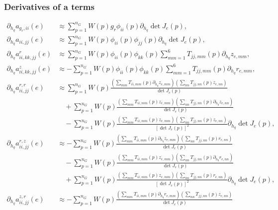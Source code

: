 \documentclass{article}
\begin{document}
\subsubsection{Derivatives of a terms}
\begin{align}
\partial_{h_q} a_{g_r,ii}(e) &\approx \sum_{p=1}^{n_G} W(p) g_r \phi_{ii}(p) \partial_{h_q} \det J_e(p), \tag{20.55}\\
\partial_{h_q} a_{ii,jj}(e) &\approx \sum_{p=1}^{n_G} W(p) \phi_{ii}(p) \phi_{jj}(p) \partial_{h_q} \det J_e(p), \tag{20.58}\\
\partial_{h_q} a_{ii,kk,jj}^{r}(e) &\approx \sum_{p=1}^{n_G} W(p) \phi_{ii}(p) \phi_{kk}(p) \sum_{mm=1}^6 T_{jj,mm}(p) \partial_{h_q} z_{e,mm}, \tag{20.61}\\
\partial_{h_q} a_{ii,kk,jj}^{z}(e) &\approx -\sum_{p=1}^{n_G} W(p) \phi_{ii}(p) \phi_{kk}(p) \sum_{mm=1}^6 T_{jj,mm}(p) \partial_{h_q} r_{e,mm}, \tag{20.64}\\
\partial_{h_q} a_{ii,jj}^{r,r}(e) &\approx \sum_{p=1}^{n_G} W(p) \frac{ \left( \sum_{mm} T_{ii,mm}(p) \partial_{h_q} z_{e,mm} \right) \left( \sum_{nn} T_{jj,nn}(p) z_{e,nn} \right) }{ \det J_e(p) } \nonumber\\
&\quad + \sum_{p=1}^{n_G} W(p) \frac{ \left( \sum_{mm} T_{ii,mm}(p) z_{e,mm} \right) \left( \sum_{nn} T_{jj,nn}(p) \partial_{h_q} z_{e,nn} \right) }{ \det J_e(p) } \nonumber\\
&\quad - \sum_{p=1}^{n_G} W(p) \frac{ \left( \sum_{mm} T_{ii,mm}(p) z_{e,mm} \right) \left( \sum_{nn} T_{jj,nn}(p) z_{e,nn} \right) }{ [\det J_e(p)]^2 } \partial_{h_q} \det J_e(p), \tag{20.67}\\
\partial_{h_q} a_{ii,jj}^{r,z}(e) &\approx -\sum_{p=1}^{n_G} W(p) \frac{ \left( \sum_{mm} T_{ii,mm}(p) \partial_{h_q} z_{e,mm} \right) \left( \sum_{nn} T_{jj,nn}(p) r_{e,nn} \right) }{ \det J_e(p) } \nonumber\\
&\quad - \sum_{p=1}^{n_G} W(p) \frac{ \left( \sum_{mm} T_{ii,mm}(p) z_{e,mm} \right) \left( \sum_{nn} T_{jj,nn}(p) \partial_{h_q} r_{e,nn} \right) }{ \det J_e(p) } \nonumber\\
&\quad + \sum_{p=1}^{n_G} W(p) \frac{ \left( \sum_{mm} T_{ii,mm}(p) z_{e,mm} \right) \left( \sum_{nn} T_{jj,nn}(p) r_{e,nn} \right) }{ [\det J_e(p)]^2 } \partial_{h_q} \det J_e(p), \tag{20.70}\\
\partial_{h_q} a_{ii,jj}^{z,r}(e) &\approx -\sum_{p=1}^{n_G} W(p) \frac{ \left( \sum_{mm} T_{ii,mm}(p) \partial_{h_q} r_{e,mm} \right) \left( \sum_{nn} T_{jj,nn}(p) z_{e,nn} \right) }{ \det J_e(p) } \nonumber\\

\end{align}
\end{document}
